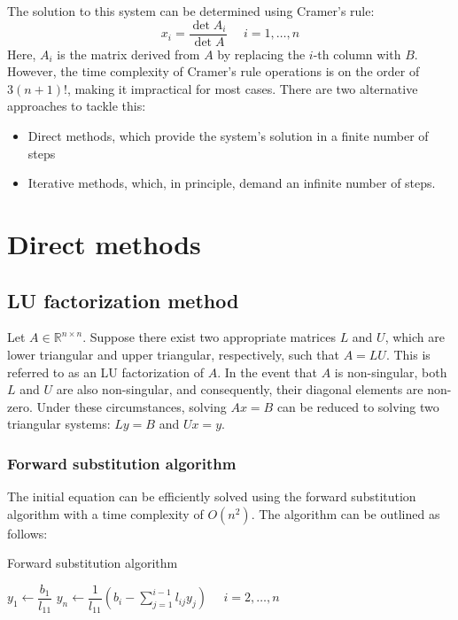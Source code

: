 \documentclass[12pt, a4paper]{report}
\begin{document}
    The solution to this system can be determined using Cramer's rule:
    \[x_i=\dfrac{\det{A_i}}{\det{A}} \:\:\:\:\:\: i=1,\dots,n\]
    Here, $A_i$ is the matrix derived from $A$ by replacing the $i$-th column with $B$. 
    However, the time complexity of Cramer's rule operations is on the order of $3(n+1)!$, making it impractical for most cases.
    There are two alternative approaches to tackle this: 
    \begin{itemize}
        \item Direct methods, which provide the system's solution in a finite number of steps
        \item Iterative methods, which, in principle, demand an infinite number of steps.
    \end{itemize}

    \section{Direct methods}
    \subsection{LU factorization method}
    Let $A \in \mathbb{R}^{n \times n}$. 
    Suppose there exist two appropriate matrices $L$ and $U$, which are lower triangular and upper triangular, respectively, such that $A=LU$. 
    This is referred to as an LU factorization of $A$.
    In the event that $A$ is non-singular, both $L$ and $U$ are also non-singular, and consequently, their diagonal elements are non-zero.
    Under these circumstances, solving $Ax=B$ can be reduced to solving two triangular systems: $Ly=B$ and $Ux=y$. 
    \subsubsection{Forward substitution algorithm}
    The initial equation can be efficiently solved using the forward substitution algorithm with a time complexity of $O(n^2)$. 
    The algorithm can be outlined as follows:
    \begin{algorithm}[H]
        \caption{Forward substitution algorithm}
            \begin{algorithmic}
                \State $y_1\leftarrow\dfrac{b_1}{l_{11}}$
                \State $y_n\leftarrow\dfrac{1}{l_{11}}\left( b_i-\sum_{j=1}^{i-1}{l_{ij}y_j} \right) \:\:\:\:\:\: i=2,\dots,n$
            \end{algorithmic}
    \end{algorithm}
\end{document}
